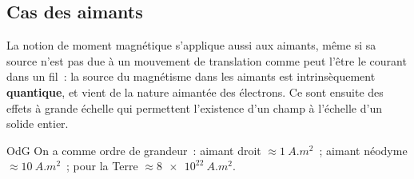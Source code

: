 \documentclass[../main/main.tex]{subfiles}
\begin{document}
\subsection{Cas des aimants}
\label{ssec:magaim}
La notion de moment magnétique s'applique aussi aux aimants, même si sa source
n'est pas due à un mouvement de translation comme peut l'être le courant dans un
fil~: la source du magnétisme dans les aimants est intrinsèquement
\textbf{quantique}, et vient de la nature aimantée des électrons. Ce sont
ensuite des effets à grande échelle qui permettent l'existence d'un champ à
l'échelle d'un solide entier.

\begin{rexem}{OdG}
	On a comme ordre de grandeur~: aimant droit $\approx \SI{1}{A.m^2}$~; aimant
	néodyme $\approx \SI{10}{A.m^2}$~; pour la Terre $\approx \SI{8e22}{A.m^2}$.
\end{rexem}
\end{document}
